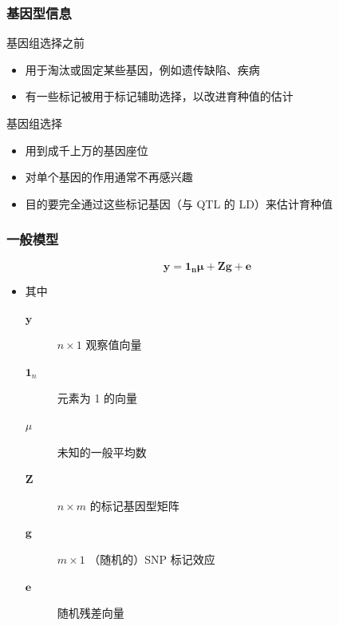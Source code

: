 \documentclass[serif,aspectratio=169]{beamer}
\begin{document}
\begin{frame}
  \frametitle{基因型信息}
  \begin{block}{基因组选择之前}
    \begin{itemize}
    \item 用于淘汰或固定某些基因，例如遗传缺陷、疾病
    \item 有一些标记被用于标记辅助选择，以改进育种值的估计
    \end{itemize}
  \end{block}

  \pause
  \begin{block}{基因组选择}
    \begin{itemize}
    \item 用到成千上万的基因座位
    \item 对单个基因的作用通常不再感兴趣
    \item 目的要完全通过这些标记基因（与 QTL 的 LD）来估计育种值
    \end{itemize}
  \end{block}
\end{frame}


\begin{frame}
  \frametitle{一般模型}
  $$\mathbf{y=1_n\mu+Zg+e}$$
  \begin{itemize}
  \item 其中
    \begin{description}
    \item [$\mathbf{y}$] $n\times 1$ 观察值向量
    \item [$\mathbf{1}_n$] 元素为 1 的向量
    \item [$\mu$] 未知的一般平均数
    \item [$\mathbf{Z}$] $n\times m$ 的标记基因型矩阵
    \item [$\mathbf{g}$] $m\times 1$ （随机的）SNP 标记效应
    \item [$\mathbf{e}$] 随机残差向量
    \end{description}
  \end{itemize}
\end{frame}
\end{document}
